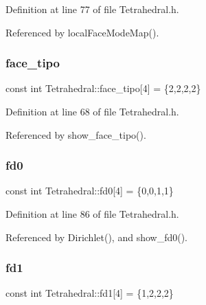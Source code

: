 Definition at line 77 of file Tetrahedral.\+h.



Referenced by local\+Face\+Mode\+Map().

\mbox{\label{classTetrahedral_a83b0685a10e8487617ddfe1e5ce28d36}} 
\subsubsection{\texorpdfstring{face\+\_\+tipo}{face\_tipo}}
{\footnotesize\ttfamily const int Tetrahedral\+::face\+\_\+tipo\mbox{[}4\mbox{]} = \{2,2,2,2\}\hspace{0.3cm}{\ttfamily [private]}}



Definition at line 68 of file Tetrahedral.\+h.



Referenced by show\+\_\+face\+\_\+tipo().

\mbox{\label{classTetrahedral_a7017ed9b075be3d84ca11ae8c5bb77d2}} 
\subsubsection{\texorpdfstring{fd0}{fd0}}
{\footnotesize\ttfamily const int Tetrahedral\+::fd0\mbox{[}4\mbox{]} = \{0,0,1,1\}\hspace{0.3cm}{\ttfamily [private]}}



Definition at line 86 of file Tetrahedral.\+h.



Referenced by Dirichlet(), and show\+\_\+fd0().

\mbox{\label{classTetrahedral_ade492a6b9a7f709f4ff8a3cbb42a3bc5}} 
\subsubsection{\texorpdfstring{fd1}{fd1}}
{\footnotesize\ttfamily const int Tetrahedral\+::fd1\mbox{[}4\mbox{]} = \{1,2,2,2\}\hspace{0.3cm}{\ttfamily [private]}}



